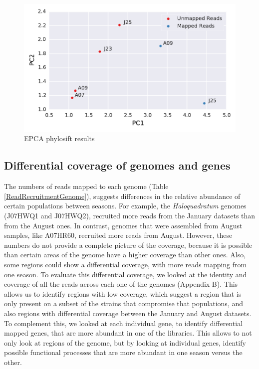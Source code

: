 \begin{figure}[hbt]
  \centering
  \includegraphics[width=\textwidth]{Chapter5/Figures/Unmapped_Mapped_EPCA.pdf}
  \caption{EPCA phylosift results}
  \label{EPCA_results}
\end{figure}


\clearpage
\subsection{Differential coverage of genomes and genes}

The numbers of reads mapped to each genome (Table \ref{ReadRecruitmentGenome}), suggests differences in the relative abundance of certain populations between seasons. For example, the \textit{Haloquadratum} genomes (J07HWQ1 and J07HWQ2), recruited more reads from the January datasets than from the August ones. In contrast, genomes that were assembled from August samples, like A07HR60, recruited more reads from August. However, these numbers do not provide a complete picture of the coverage, because it is possible than certain areas of the genome have a higher coverage than other ones. Also, some regions could show a differential coverage, with more reads mapping from one season. To evaluate this differential coverage, we looked at the identity and coverage of all the reads across each one of the genomes (Appendix B). This allows us to identify regions with low coverage, which suggest a region that is only present on a subset of the strains that compromise that populations, and also regions with differential coverage between the January and August datasets. To complement this, we looked at each individual gene, to identify differential mapped genes, that are more abundant in one of the libraries. This allows to not only look at regions of the genome, but by looking at individual genes, identify possible functional processes that are more abundant in one season versus the other.

